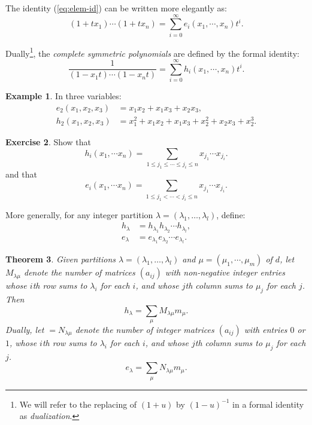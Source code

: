 \documentclass[11pt]{amsart}
\newtheorem{theorem}{Theorem}[subsection]
\theoremstyle{definition}
\theoremstyle{example}
\newtheorem{example}[theorem]{Example}
\newtheorem{exercise}[theorem]{Exercise}
\begin{document}
The identity (\ref{eq:elem-id}) can be written more elegantly as:
\begin{displaymath}
  (1+t x_1) \dotsb (1+tx_n) = \sum_{i=0}^\infty e_i(x_1,\dotsb, x_n)t^i.
\end{displaymath}

Dually\footnote{We will refer to the replacing of $(1+u)$ by $(1-u)^{-1}$ in a formal identity as \emph{dualization}.}, the \emph{complete symmetric polynomials} are defined by the formal identity:
\begin{displaymath}
  \frac 1{(1-x_1t)\dotsb (1-x_nt)} = \sum_{i=0}^\infty h_i(x_1,\dotsb, x_n)t^i.
\end{displaymath}
\begin{example}
  In three variables:
  \begin{align*}
    e_2(x_1,x_2,x_3) & = x_1x_2 + x_1x_3 + x_2x_3,\\
    h_2(x_1,x_2,x_3) & = x_1^2 + x_1x_2 + x_1x_3 + x_2^2 + x_2x_3 + x_2^3.
  \end{align*}
\end{example}
\begin{exercise}
  Show that
  \begin{displaymath}
    h_i(x_1,\dotsb x_n) = \sum_{1\leq j_1\leq \dotsb \leq j_i\leq n} x_{j_1}\dotsb x_{j_i}.
  \end{displaymath}
  and that
  \begin{displaymath}
    e_i(x_1,\dotsb x_n) = \sum_{1\leq j_1< \dotsb < j_i\leq n} x_{j_1}\dotsb x_{j_i}.
  \end{displaymath}
\end{exercise}
More generally, for any integer partition $\lambda=(\lambda_1,\dotsc, \lambda_l)$, define:
\begin{align*}
  h_\lambda &= h_{\lambda_1} h_{\lambda_2}\dotsb h_{\lambda_l},\\
  e_\lambda &= e_{\lambda_1} e_{\lambda_2}\dotsb e_{\lambda_l}.
\end{align*}
\begin{theorem}
  Given partitions $\lambda=(\lambda_1,\dotsc,\lambda_l)$ and $\mu=(\mu_1,\dotsb, \mu_m)$ of $d$, let $M_{\lambda\mu}$ denote the number of matrices $(a_{ij})$ with non-negative integer entries whose $i$th row sums to $\lambda_i$ for each $i$, and whose $j$th column sums to $\mu_j$ for each $j$.
  Then
  \begin{displaymath}
    h_\lambda = \sum_\mu M_{\lambda\mu} m_\mu.
  \end{displaymath}
  Dually, let $=N_{\lambda\mu}$ denote the number of integer matrices $(a_{ij})$ with entries $0$ or $1$, whose $i$th row sums to $\lambda_i$ for each $i$, and whose $j$th column sums to $\mu_j$ for each $j$.
  \begin{displaymath}
    e_\lambda = \sum_\mu N_{\lambda\mu} m_\mu.
  \end{displaymath}
\end{theorem}
\end{document}
